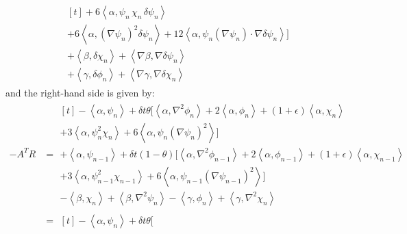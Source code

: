 \documentclass[reqno]{article}
\begin{document}
\begin{equation}
\begin{split}
\begin{multlined}[t]
                + 6 \left< \alpha, \psi_n \, \chi_n \, \delta \psi_n \right> \\
                + 6 \left<\alpha, \left(\nabla \psi_n\right)^2 \delta \psi_n \right>
                + 12 \left< \alpha, \psi_n \left(\nabla \psi_n \right) \cdot \nabla \delta \psi_n \right>
            \bigr] \\
            + \left< \beta, \delta \chi_n \right>
            + \left< \nabla \beta, \nabla \delta \psi_n \right> \\
            + \left< \gamma, \delta \phi_n \right>
            + \left< \nabla \gamma, \nabla \delta \chi_n \right>
        \end{multlined}
    \end{split}
\end{equation}
and the right-hand side is given by:
\begin{equation}
    \begin{split}
        -A^T R
        &=
        \begin{multlined}[t]
            -\left<\alpha, \psi_n \right>
            + \delta t \theta \bigl[
                \left<\alpha, \nabla^2 \phi_n \right> 
                + 2 \left< \alpha, \phi_n \right>  
                + \left(1 + \epsilon\right) \left< \alpha, \chi_n \right> \\
                + 3 \left< \alpha, \psi_n^2 \chi_n \right>
                + 6 \left< \alpha, \psi_n \left(\nabla \psi_n \right)^2 \right>
                \bigr] \\
            + \left< \alpha, \psi_{n - 1} \right>
            + \delta t \left(1 - \theta \right) \bigl[
                \left<\alpha, \nabla^2 \phi_{n - 1} \right>
                + 2 \left< \alpha, \phi_{n - 1} \right> 
                + \left(1 + \epsilon\right) \left<\alpha, \chi_{n - 1} \right> \\
                + 3 \left< \alpha, \psi_{n - 1}^2 \chi_{n - 1} \right> 
                + 6 \left< \alpha, \psi_{n - 1} \left(\nabla \psi_{n - 1}\right)^2 \right>
            \bigr] \\
            - \left<\beta, \chi_n \right>
            + \left<\beta, \nabla^2 \psi_n\right>
            - \left< \gamma, \phi_n \right>
            + \left< \gamma, \nabla^2 \chi_n \right>
        \end{multlined} \\
        &=
        \begin{multlined}[t]
            -\left<\alpha, \psi_n \right>
            + \delta t \theta \bigl[

\end{multlined}
\end{split}
\end{equation}
\end{document}
